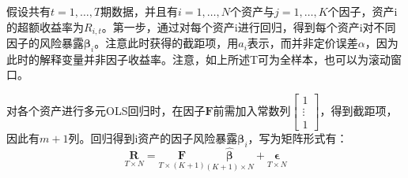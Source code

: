 \documentclass[11pt]{article}
\begin{document}
假设共有$t=1,\dots,T$期数据，并且有$i=1,\dots,N$个资产与$j=1,\dots,K$个因子，资产i的超额收益率为$R_{i,t}$。第一步，通过对每个资产i进行回归，得到每个资产i对不同因子的风险暴露$\bm{\beta}_i$。注意此时获得的截距项，用$a_i$表示，而并非定价误差$\alpha$，因为此时的解释变量并非因子收益率。注意，如上所述T可为全样本，也可以为滚动窗口。

对各个资产进行多元OLS回归时，在因子$\bm{F}$前需加入常数列$\begin{bmatrix}1 \\ \vdots \\ 1\end{bmatrix}$，得到截距项，因此有$m+1$列。回归得到i资产的因子风险暴露$\bm{\beta}_i$，写为矩阵形式有：
\begin{equation*}
    \underset{T \times N}{\bm{R}} = \underset{T\times(K+1)}{\bm{F}} \underset{(K+1)\times N}{\hat{\bm{\beta}}} + \underset{T\times N}{\bm{\epsilon}}
\end{equation*}
\end{document}
